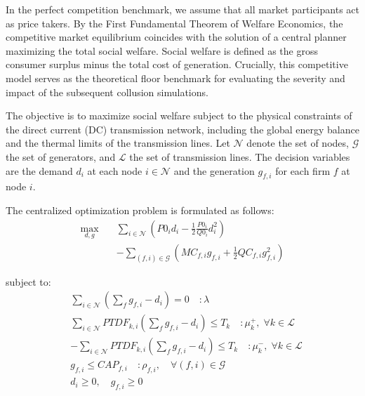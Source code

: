 \documentclass[lettersize,journal]{IEEEtran}
\begin{document}
In the perfect competition benchmark, we assume that all market participants act as price takers. By the First Fundamental Theorem of Welfare Economics, the competitive market equilibrium coincides with the solution of a central planner maximizing the total social welfare. Social welfare is defined as the gross consumer surplus minus the total cost of generation. Crucially, this competitive model serves as the theoretical floor benchmark for evaluating the severity and impact of the subsequent collusion simulations.

The objective is to maximize social welfare subject to the physical constraints of the direct current (DC) transmission network, including the global energy balance and the thermal limits of the transmission lines. Let $\mathcal{N}$ denote the set of nodes, $\mathcal{G}$ the set of generators, and $\mathcal{L}$ the set of transmission lines. The decision variables are the demand $d_i$ at each node $i \in \mathcal{N}$ and the generation $g_{f,i}$ for each firm $f$ at node $i$.

The centralized optimization problem is formulated as follows:
\begin{equation}
\begin{split}
    \max_{d, g} \quad & \sum_{i \in \mathcal{N}} \left( P0_i d_i - \frac{1}{2} \frac{P0_i}{Q0_i} d_i^2 \right) \\
    & - \sum_{(f,i) \in \mathcal{G}} \left( MC_{f,i} g_{f,i} + \frac{1}{2} QC_{f,i} g_{f,i}^2 \right)
\end{split}
\end{equation}

subject to:
\begin{align}
    & \sum_{i \in \mathcal{N}} \left( \sum_f g_{f,i} - d_i \right) = 0 \quad : \lambda \\
    & \sum_{i \in \mathcal{N}} PTDF_{k,i} \left( \sum_f g_{f,i} - d_i \right) \leq T_k \quad : \mu_k^+, \; \forall k \in \mathcal{L} \\
    & -\sum_{i \in \mathcal{N}} PTDF_{k,i} \left( \sum_f g_{f,i} - d_i \right) \leq T_k \quad : \mu_k^-, \; \forall k \in \mathcal{L} \\
    & g_{f,i} \leq CAP_{f,i} \quad : \rho_{f,i}, \quad \forall (f,i) \in \mathcal{G} \\
    & d_i \geq 0, \quad g_{f,i} \geq 0
\end{align}
\end{document}
